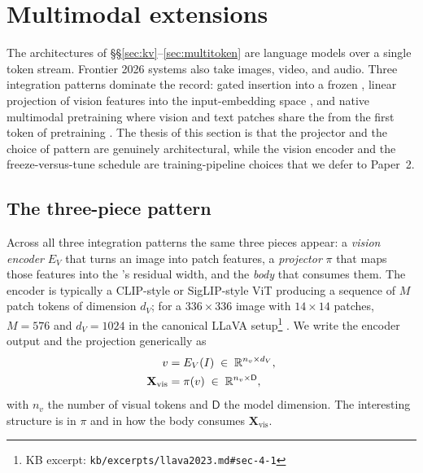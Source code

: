 
\section{Multimodal extensions}
\label{sec:multimodal}
\label{sec:multimodal-extensions}

The architectures of \S\S\ref{sec:kv}--\ref{sec:multitoken} are 
language models over a single token stream. Frontier 2026 systems also
take images, video, and audio. Three integration patterns dominate the
record: gated  insertion into a frozen 
\citep{alayrac2022-flamingo}, linear projection of vision features into
the  input-embedding space \citep{llava2023}, and native multimodal
pretraining where vision and text patches share the 
from the first token of pretraining
\citep{meta-llama4,internvl3-2025,gemini2-5}. The thesis of this
section is that the projector and the choice of pattern are
genuinely architectural, while the vision encoder and the
freeze-versus-tune schedule are training-pipeline choices that we
defer to Paper~2.

\subsection{The three-piece pattern}
\label{sec:multimodal-three-piece}

Across all three integration patterns the same three pieces appear: a
\emph{vision encoder} $E_V$ that turns an image into patch features, a
\emph{projector} $\pi$ that maps those features into the 's residual
width, and the \emph{ body} that consumes them. The encoder is
typically a CLIP-style or SigLIP-style ViT producing a sequence of
$M$ patch tokens of dimension $d_V$; for a $336{\times}336$ image with
$14{\times}14$ patches, $M{=}576$ and $d_V{=}1024$ in the canonical
LLaVA setup\footnote{KB excerpt: \texttt{kb/excerpts/llava2023.md\#sec-4-1}}
\citep{llava2023}. We write the encoder output and the projection
generically as
\begin{align}
v &= E_V(I) \;\in\; \mathbb{R}^{n_v \times d_V}, \label{eq:multimodal-encoder}\\
\mathbf{X}_{\text{vis}} &= \pi(v) \;\in\; \mathbb{R}^{n_v \times \mathsf{D}}, \label{eq:multimodal-projector}
\end{align}
with $n_v$ the number of visual tokens and $\mathsf{D}$ the  model
dimension. The interesting structure is in $\pi$ and in how the body
consumes $\mathbf{X}_{\text{vis}}$.

